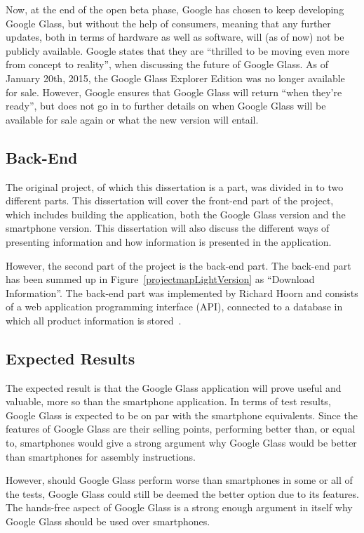 Now, at the end of the open beta phase, Google has chosen to keep developing Google Glass, but without the help of consumers, meaning that any further updates, both in terms of hardware as well as software, will (as of now) not be publicly available. Google states that they are ``thrilled to be moving even more from concept to reality'', when discussing the future of Google Glass. As of January 20th, 2015, the Google Glass Explorer Edition was no longer available for sale. However, Google ensures that Google Glass will return ``when they're ready'', but does not go in to further details on when Google Glass will be available for sale again or what the new version will entail. 

\subsection{Back-End}
The original project, of which this dissertation is a part, was divided in to two different parts. This dissertation will cover the front-end part of the project, which includes building the application, both the Google Glass version and the smartphone version. This dissertation will also discuss the different ways of presenting information and how information is presented in the application.

However, the second part of the project is the back-end part. The back-end part has been summed up in Figure~\ref{projectmapLightVersion} as ``Download Information''. The back-end part was implemented by Richard Hoorn and consists of a web application programming interface (API), connected to a database in which all product information is stored~\cite{hoorn}. 

\subsection{Expected Results}
The expected result is that the Google Glass application will prove useful and valuable, more so than the smartphone application. In terms of test results, Google Glass is expected to be on par with the smartphone equivalents. Since the features of Google Glass are their selling points, performing better than, or equal to, smartphones would give a strong argument why Google Glass would be better than smartphones for assembly instructions.

However, should Google Glass perform worse than smartphones in some or all of the tests, Google Glass could still be deemed the better option due to its features. The hands-free aspect of Google Glass is a strong enough argument in itself why Google Glass should be used over smartphones. 

